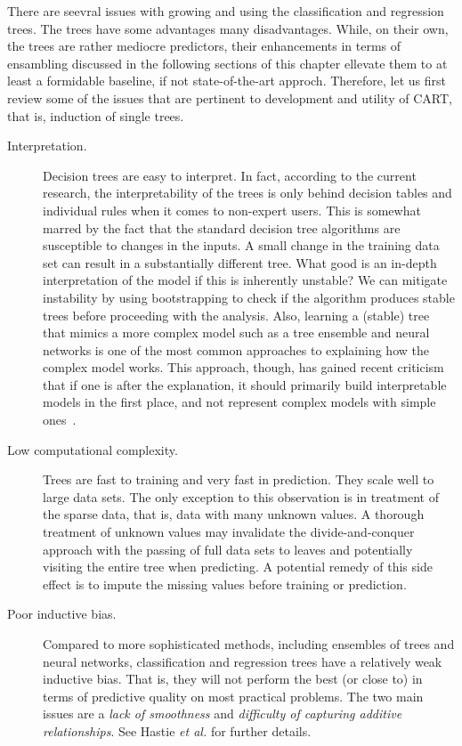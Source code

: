 There are seevral issues with growing and using the classification and regression trees. The trees have some advantages many disadvantages. While, on their own, the trees are rather mediocre predictors, their enhancements in terms of ensambling discussed in the following sections of this chapter ellevate them to at least a formidable baseline, if not state-of-the-art approch. Therefore, let us first review some of the issues that are pertinent to development and utility of CART, that is, induction of single trees.

\begin{description}
\item[Interpretation.] Decision trees are easy to interpret. In fact, according to the current research, the interpretability of the trees is only behind decision tables and individual rules when it comes to non-expert users. This is somewhat marred by the fact that the standard decision tree algorithms are susceptible to changes in the inputs. A small change in the training data set can result in a substantially different tree. What good is an in-depth interpretation of the model if this is inherently unstable? We can mitigate instability by using bootstrapping to check if the algorithm produces stable trees before proceeding with the analysis. Also, learning a (stable) tree that mimics a more complex model such as a tree ensemble and neural networks is one of the most common approaches to explaining how the complex model works. This approach, though, has gained recent criticism that if one is after the explanation, it should primarily build interpretable models in the first place, and not represent complex models with simple ones~\cite{Rudin2019}.

\item[Low computational complexity.] Trees are fast to training and very fast in prediction. They scale well to large data sets. The only exception to this observation is in treatment of the sparse data, that is, data with many unknown values. A thorough treatment of unknown values may invalidate the divide-and-conquer approach with the passing of full data sets to leaves and potentially visiting the entire tree when predicting. A potential remedy of this side effect is to impute the missing values before training or prediction.

\item[Poor inductive bias.] Compared to more sophisticated methods, including ensembles of trees and neural networks, classification and regression trees have a relatively weak inductive bias. That is, they will not perform the best (or close to) in terms of predictive quality on most practical problems. The two main issues are a {\em lack of smoothness} and {\em difficulty of capturing additive relationships}. See Hastie {\em et al.} for further details.


\end{description}

